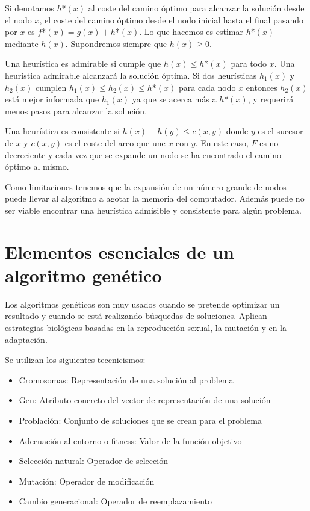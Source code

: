 \documentclass[12pt]{article}
\begin{document}
Si denotamos $h$*$(x)$ al coste del camino óptimo para alcanzar la
solución desde el nodo $x$, el coste del camino óptimo desde el nodo
inicial hasta el final pasando por $x$ es $f$*$(x)=g(x)+h$*$(x)$. Lo
que hacemos es estimar $h$*$(x)$ mediante $h(x)$. Supondremos siempre
que $h(x)\geq 0$.

Una heurística es admirable si cumple que $h(x) \leq h$*$(x)$ para
todo $x$. Una heurística admirable alcanzará la solución óptima. Si
dos heurísticas $h_1(x)$ y $h_2(x)$ cumplen
$h_1(x) \leq h_2(x) \leq h$*$(x)$ para cada nodo $x$ entonces $h_2(x)$
está mejor informada que $h_1(x)$ ya que se acerca más a $h$*$(x)$, y
requerirá menos pasos para alcanzar la solución.

Una heurística es consistente si $h(x) - h(y) \leq c(x,y)$ donde $y$
es el sucesor de $x$ y $c(x,y)$ es el coste del arco que une $x$ con
$y$. En este caso, $F$ es no decreciente y cada vez que se expande un
nodo se ha encontrado el camino óptimo al mismo.

Como limitaciones tenemos que la expansión de un número grande de
nodos puede llevar al algoritmo a agotar la memoria del
computador. Además puede no ser viable encontrar una heurística
admisible y consistente para algún problema.

\section{Elementos esenciales de un algoritmo genético}

Los algoritmos genéticos son muy usados cuando se pretende optimizar
un resultado y cuando se está realizando búsquedas de
soluciones. Aplican estrategias biológicas basadas en la reproducción
sexual, la mutación y en la adaptación.

Se utilizan los siguientes teccnicismos:

\begin{itemize}
\item Cromosomas: Representación de una solución al problema
\item Gen: Atributo concreto del vector de representación de una solución
\item Problación: Conjunto de soluciones que se crean para el problema
\item Adecuación al entorno o fitness: Valor de la función objetivo
\item Selección natural: Operador de selección
\item Mutación: Operador de modificación
\item Cambio generacional: Operador de reemplazamiento
\end{itemize}
\end{document}
